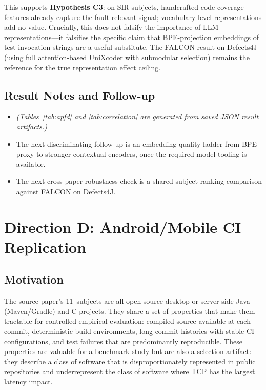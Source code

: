 \documentclass[10pt,conference]{IEEEtran}
\begin{document}
This supports \textbf{Hypothesis C3}: on SIR subjects, handcrafted code-coverage features already capture the fault-relevant signal; vocabulary-level representations add no value. Crucially, this does not falsify the importance of LLM representations---it falsifies the specific claim that BPE-projection embeddings of test invocation strings are a useful substitute. The FALCON result on Defects4J (using full attention-based UniXcoder with submodular selection) remains the reference for the true representation effect ceiling.

\subsection{Result Notes and Follow-up}

\begin{itemize}[leftmargin=*]
\item \textit{(Tables~\ref{tab:apfd} and \ref{tab:correlation} are generated from saved JSON result artifacts.)}
\item The next discriminating follow-up is an embedding-quality ladder from BPE proxy to stronger contextual encoders, once the required model tooling is available.
\item The next cross-paper robustness check is a shared-subject ranking comparison against FALCON on Defects4J.
\end{itemize}

\section{Direction D: Android/Mobile CI Replication}\label{sec:direction_d}

\subsection{Motivation}

The source paper's 11~subjects are all open-source desktop or server-side Java (Maven/Gradle) and C projects. They share a set of properties that make them tractable for controlled empirical evaluation: compiled source available at each commit, deterministic build environments, long commit histories with stable CI configurations, and test failures that are predominantly reproducible. These properties are valuable for a benchmark study but are also a selection artifact: they describe a class of software that is disproportionately represented in public repositories and underrepresent the class of software where TCP has the largest latency impact.
\end{document}
